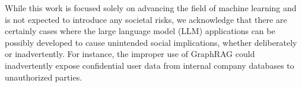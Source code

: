 \documentclass{article}
\begin{document}
While this work is focused solely on advancing the field of machine learning and is not expected to introduce any societal risks, we acknowledge that there are certainly cases where the large language model (LLM) applications can be possibly developed to cause unintended social implications, whether deliberately or inadvertently. For instance, the improper use of GraphRAG could inadvertently expose confidential user data from internal company databases to unauthorized parties.









% 

\end{document}
